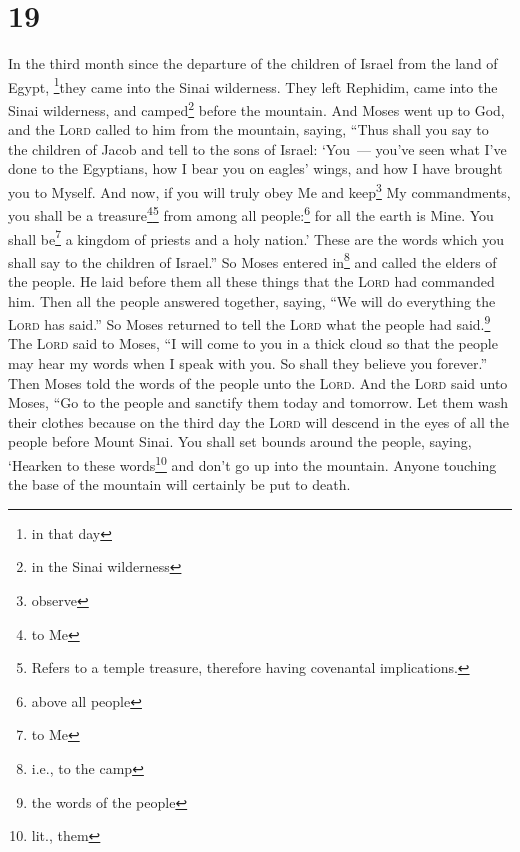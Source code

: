 \section{19}\label{exodus:19}
\begin{enumerate}[align=center]
     In the third month since the departure of the children of Israel from the land of Egypt, \footnote{in that day}they came into the Sinai wilderness.%
     They left Rephidim, came into the Sinai wilderness, and camped\footnote{in the Sinai wilderness} before the mountain.%
     And Moses went up to God, and the \textsc{Lord} called to him from the mountain, saying, ``Thus shall you say to the children of Jacob and tell to the sons of Israel:%
     `You~--- you've seen what I've done to the Egyptians, how I bear you on eagles' wings, and how I have brought you to Myself.%
     And now, if you will truly obey Me and keep\footnote{observe} My commandments, you shall be a treasure\footnote{to Me}\footnote{Refers to a temple treasure, therefore having covenantal implications.} from among all people:\footnote{above all people} for all the earth is Mine.%
     You shall be\footnote{to Me} a kingdom of priests and a holy nation.' These are the words which you shall say to the children of Israel.''%
     So Moses entered in\footnote{i.e., to the camp} and called the elders of the people. He laid before them all these things that the \textsc{Lord} had commanded him.%
     Then all the people answered together, saying, ``We will do everything the \textsc{Lord} has said.'' So Moses returned to tell the \textsc{Lord} what the people had said.\footnote{the words of the people}%
     The \textsc{Lord} said to Moses, ``I will come to you in a thick cloud so that the people may hear my words when I speak with you. So shall they believe you forever.'' Then Moses told the words of the people unto the \textsc{Lord}.%
     And the \textsc{Lord} said unto Moses, ``Go to the people and sanctify them today and tomorrow. Let them wash their clothes%
     because on the third day the \textsc{Lord} will descend in the eyes of all the people before Mount Sinai.%
     You shall set bounds around the people, saying, `Hearken to these words\footnote{lit., them} and don't go up into the mountain. Anyone touching the base of the mountain will certainly be put to death.%

\end{enumerate}
